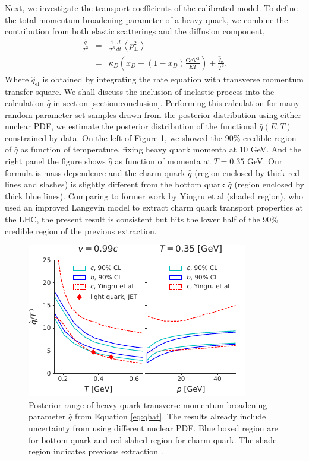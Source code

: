 \documentclass[aps, prc, reprint, amsmath, groupedaddress, nofootinbib]{revtex4-1}
\begin{document}
Next, we investigate the transport coefficients of the calibrated model.
To define the total momentum broadening parameter of a heavy quark,
we combine the contribution from both elastic scatterings and the diffusion component,
\begin{eqnarray}\label{eq:qhat}
\frac{\hat{q}}{T^3} &=& \frac{1}{T^3}\frac{d}{dt}\left\langle p_\perp^2 \right\rangle\\
\nonumber
 &=&  \kappa_D\left(x_D + (1-x_D)\frac{\textrm{GeV}^2}{ET}\right) + \frac{\hat{q}_{\textrm{el}}}{T^3}.
\end{eqnarray}
Where $\hat{q}_{\textrm{el}}$ is obtained by integrating the rate equation with transverse momentum transfer square.
We shall discuss the inclusion of inelastic process into the calculation $\hat{q}$ in section \ref{section:conclusion}.
Performing this calculation for many random parameter set samples drawn from the posterior distribution using either nuclear PDF, we estimate the posterior distribution of the functional $\hat{q}(E, T)$ constrained by data.
On the left of Figure \ref{plots:posterior_qhat}, we showed the 90\% credible region of $\hat{q}$ as function of temperature, fixing heavy quark momenta at $10$ GeV.
And the right panel the figure shows $\hat{q}$ as function of momenta at $T=0.35$ GeV.
Our formula is mass dependence and the charm quark $\hat{q}$ (region enclosed by thick red lines and slashes) is slightly different from the bottom quark $\hat{q}$ (region enclosed by thick blue lines).
Comparing to former work by Yingru et al (shaded region), who used an improved Langevin model to extract charm quark transport properties at the LHC, the present result is consistent but hits the lower half of the 90\% credible region of the previous extraction.
\begin{figure}
\includegraphics[width=\columnwidth]{qhat_p_T.pdf}
\caption{Posterior range of heavy quark transverse momentum broadening parameter $\hat{q}$ from Equation \ref{eq:qhat}. The results already include uncertainty from using different nuclear PDF. Blue boxed region are for bottom quark and red slahed region for charm quark. The shade region indicates previous extraction \cite{Xu:2017obm}.}\label{plots:posterior_qhat}
\end{figure}
\end{document}
